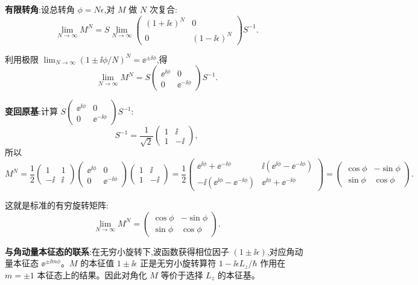\begin{solution}
	\textbf{有限转角}:设总转角 $\phi=N\epsilon$,对 $M$ 做 $N$ 次复合:
	\[
	\lim_{N\to\infty}M^N
	= S\lim_{N\to\infty}\begin{pmatrix}(1+\ii\epsilon)^N&0\\0&(1-\ii\epsilon)^N\end{pmatrix}S^{-1}.
	\]

	利用极限 $\lim_{N\to\infty}(1\pm\ii\phi/N)^N=\ee^{\pm\ii\phi}$,得
	\[
	\lim_{N\to\infty}M^N = S\begin{pmatrix}\ee^{\ii\phi}&0\\0&\ee^{-\ii\phi}\end{pmatrix}S^{-1}.
	\]

	\textbf{变回原基}:计算 $S\begin{pmatrix}\ee^{\ii\phi}&0\\0&\ee^{-\ii\phi}\end{pmatrix}S^{-1}$:
	\[
	S^{-1}=\frac{1}{\sqrt{2}}\begin{pmatrix}1&\ii\\1&-\ii\end{pmatrix},
	\]
	所以
	\[
	M^N = \frac12\begin{pmatrix}1&1\\-\ii&\ii\end{pmatrix}
	\begin{pmatrix}\ee^{\ii\phi}&0\\0&\ee^{-\ii\phi}\end{pmatrix}
	\begin{pmatrix}1&\ii\\1&-\ii\end{pmatrix}
	=\frac12\begin{pmatrix}\ee^{\ii\phi}+\ee^{-\ii\phi}&\ii(\ee^{\ii\phi}-\ee^{-\ii\phi})\\
	-\ii(\ee^{\ii\phi}-\ee^{-\ii\phi})&\ee^{\ii\phi}+\ee^{-\ii\phi}\end{pmatrix}
	=\begin{pmatrix}\cos\phi&-\sin\phi\\ \sin\phi&\cos\phi\end{pmatrix}.
	\]

	这就是标准的有穷旋转矩阵:
	\[
	\boxed{\lim_{N\to\infty}M^N = \begin{pmatrix}\cos\phi&-\sin\phi\\ \sin\phi&\cos\phi\end{pmatrix}}.
	\]

	\textbf{与角动量本征态的联系}:在无穷小旋转下,波函数获得相位因子 $(1\pm\ii\epsilon)$,对应角动量本征态 $\ee^{\pm\ii m\phi}$。$M$ 的本征值 $1\pm\ii\epsilon$ 正是无穷小旋转算符 $1-\ii\epsilon L_z/\hbar$ 作用在 $m=\pm1$ 本征态上的结果。因此对角化 $M$ 等价于选择 $L_z$ 的本征基。
	\end{solution}

